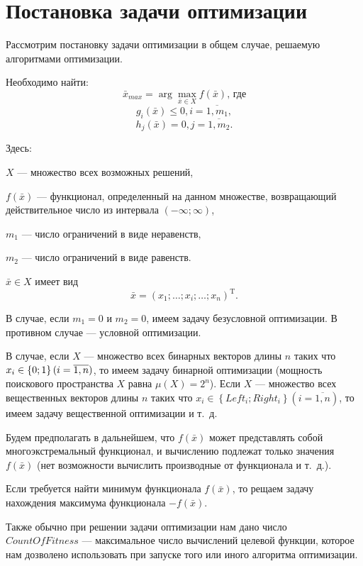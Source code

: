 \section{Постановка задачи оптимизации}\label{HarrixOptimizationAlgorithms:section_problemoptimization}

Рассмотрим постановку задачи оптимизации в общем случае, решаемую алгоритмами оптимизации.

Необходимо найти:
\begin{equation}
\label{HarrixOptimizationAlgorithms:eq:problemoptimization}
\bar{x}_{max} = \arg{ \max_{\bar{x} \in X}{f\left ( \bar{x} \right )} }\text {, где}
\end{equation}
\begin{equation*}
g_i\left (\bar{x}\right )\leq 0, i=\overline{1,m_1},
\end{equation*}
\begin{equation*}
h_j\left (\bar{x}\right )= 0, j=\overline{1,m_2}.
\end{equation*}

Здесь:

$ X $ --- множество всех возможных решений,

$ f\left ( \bar{x} \right ) $ --- функционал, определенный на данном множестве, возвращающий действительное число из интервала $ (-\infty;\infty) $,

$ m_1 $ --- число ограничений в виде неравенств,

$ m_2 $ --- число ограничений в виде равенств.

$ \bar{x} \in X $ имеет вид 
\begin{equation}
\label{StandardGA:eq:formofvector}
\bar{x}={\left(x_1;\dots;x_i;\dots;x_n \right)}^\mathrm{T}.
\end{equation}

В случае, если $ m_1=0 $ и $ m_2=0 $, имеем задачу безусловной оптимизации. В противном случае --- условной оптимизации.

В случае, если $ X $ --- множество всех бинарных векторов длины $ n $ таких что $ x_i\in\left\lbrace 0;1\right\rbrace  (i\hmm=\overline{1,n})$, то имеем задачу бинарной оптимизации (мощность поискового пространства $ X $ равна $ \mu(X)=2^n $). Если $ X $ --- множество всех вещественных векторов длины $ n $ таких что $ x_i\in\left\lbrace Left_i;Right_i\right\rbrace (i=\overline{1,n}) $, то имеем задачу вещественной оптимизации  и т.~д.

Будем предполагать в дальнейшем, что $ f(\bar{x}) $ может представлять собой  многоэкстремальный функционал, и вычислению подлежат только значения $ f(\bar{x}) $ (нет возможности вычислить производные от функционала и т.~д.).

Если требуется найти минимум функционала $ f\left ( \bar{x} \right ) $, то рещаем задачу нахождения максимума функционала $ -f\left ( \bar{x} \right ) $.

Также обычно при решении задачи оптимизации нам дано число $ CountOfFitness $ --- максимальное число вычислений целевой функции, которое нам дозволено использовать при запуске того или иного алгоритма оптимизации.
